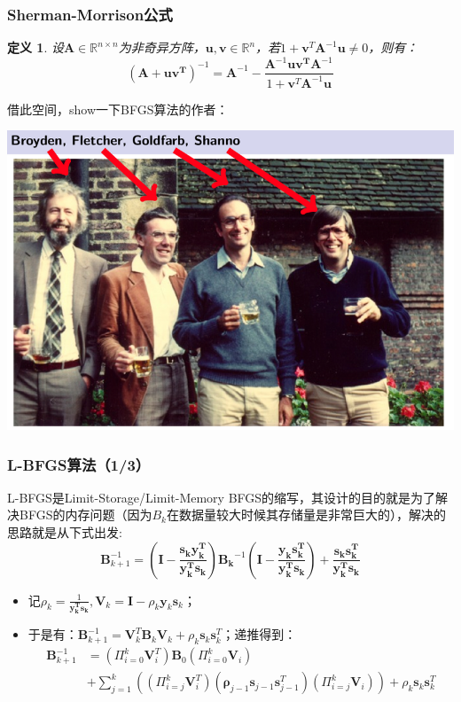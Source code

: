 \documentclass{beamer}
\newtheorem{defn}[thm]{定义}
\begin{document}
\begin{frame}\frametitle{Sherman-Morrison公式}
\begin{defn}
设$\bm{A} \in \mathbb{R}^{n \times n}$为非奇异方阵，$\bm{u,v} \in \mathbb{R}^{n}$，若$1+\bm{v}^{T}\bm{A}^{-1}\bm{u}\neq 0$，则有：
\begin{displaymath}
(\bm{A}+\bm{uv^{T}})^{-1}=\bm{A}^{-1}-\frac{\bm{A}^{-1}\bm{uv^{T}}\bm{A}^{-1}}{1+\bm{v}^{T}\bm{A}^{-1}\bm{u}}
\end{displaymath}
\end{defn}
借此空间，show一下BFGS算法的作者：
\begin{center}
\includegraphics[width=0.6\linewidth]{Images/bfgs.png}
\end{center}
\end{frame}
\begin{frame}\frametitle{L-BFGS算法（1/3）}
\label{LBFGS_Method}
L-BFGS是Limit-Storage/Limit-Memory BFGS的缩写，其设计的目的就是为了解决BFGS的内存问题（因为$B_k$在数据量较大时候其存储量是非常巨大的），解决的思路就是从下式出发:
\begin{displaymath}
\bm{B}_{k+1}^{-1}=\left(\bm{I}-\frac{\bm{s_ky_{k}^{T}}}{\bm{y_{k}^{T}s_{k}}}\right)\bm{B_k}^{-1}\left(\bm{I}-\frac{\bm{y_ks_{k}^{T}}}{\bm{y_{k}^{T}s_{k}}}\right)+\frac{\bm{s_{k}s_{k}^{T}}}{\bm{y_{k}^{T}s_{k}}}
\end{displaymath}
\begin{itemize}
\item 记$\rho_{k}=\frac{1}{\bm{y_{k}^{T}s_{k}}},\bm{V}_k=\bm{I}-\rho_k\bm{y}_k\bm{s}_k$；
\item 于是有：$\bm{B}_{k+1}^{-1}=\bm{V}_{k}^{T}\bm{B}_{k}\bm{V}_{k}+\rho_{k}\bm{s}_k\bm{s}_{k}^{T}$；递推得到：
\begin{displaymath}
\begin{split}
\bm{B}_{k+1}^{-1}&=\left(\Pi_{i=0}^{k}\bm{V}_{i}^{T}\right)\bm{B}_{0}\left(\Pi_{i=0}^{k}\bm{V}_{i}\right)\\
&+\sum_{j=1}^{k}\left(\left(\Pi_{i=j}^{k}\bm{V}_{i}^{T}\right)(\bm{\rho}_{j-1}\bm{s}_{j-1}\bm{s}_{j-1}^{T})\left(\Pi_{i=j}^{k}\bm{V}_{i}\right)\right)+\rho_{k}\bm{s}_k\bm{s}_{k}^{T}
\end{split}
\end{displaymath}
\end{itemize}
\end{frame}
\end{document}
